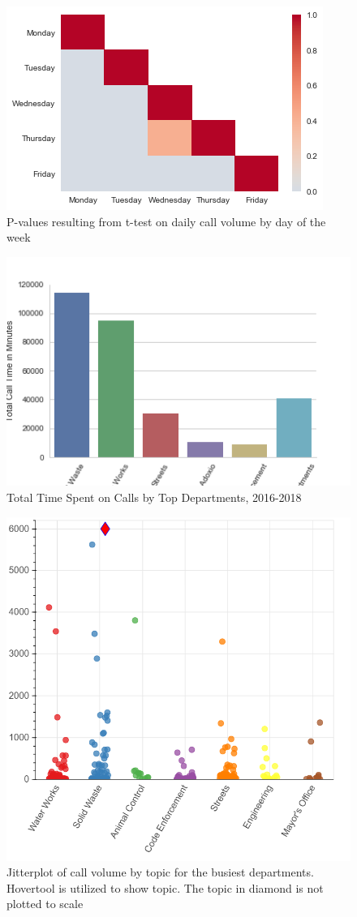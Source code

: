 \documentclass{article}
\begin{document}
\begin{figure}[p]
	\includegraphics[scale=.5]{Daily_Heatmap.png}
	\caption{P-values resulting from t-test on daily call volume by day of the week}
\end{figure}

\begin{figure}[p]
	\includegraphics[scale=.6]{Calls_Department.png}
	\caption{Total Time Spent on Calls by Top Departments, 2016-2018}
\end{figure}

\begin{figure}[p]
  \includegraphics[scale=0.25]{jitterplot.png}
  \caption{Jitterplot of call volume by topic for the busiest departments.  Hovertool is utilized to show topic.  The topic in diamond is not plotted to scale}
\end{figure}
\end{document}
